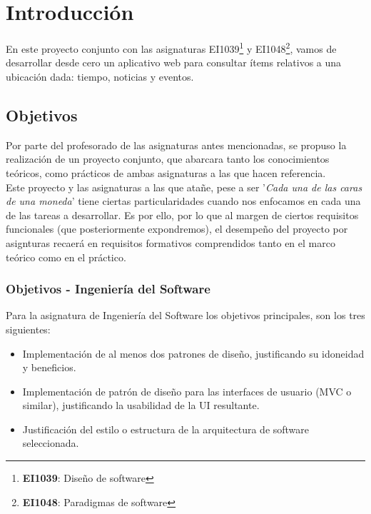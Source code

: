 \documentclass[../ei103948-project-documentation.tex]{subfiles}
\begin{document}
\section{Introducción}

    En este proyecto conjunto con las asignaturas EI1039\footnote{\textbf{EI1039}: Diseño de software} y EI1048\footnote{\textbf{EI1048}: Paradigmas de software}, vamos de desarrollar desde cero un aplicativo web para consultar ítems relativos a una ubicación dada: tiempo, noticias y eventos.\\

    \subsection{Objetivos}
    Por parte del profesorado de las asignaturas antes mencionadas, se propuso la realización de un proyecto conjunto, que abarcara tanto los conocimientos teóricos, como prácticos de ambas asignaturas a las que hacen referencia.\\

    Este proyecto y las asignaturas a las que atañe, pese a ser '\textit{Cada una de las caras de una moneda}' tiene ciertas particularidades cuando nos enfocamos en cada una de las tareas a desarrollar. Es por ello, por lo que al margen de ciertos requisitos funcionales (que posteriormente expondremos), el desempeño del proyecto por asignturas recaerá en requisitos formativos comprendidos tanto en el marco teórico como en el práctico.\\

        \subsubsection{Objetivos - Ingeniería del Software}
        Para la asignatura de Ingeniería del Software los objetivos principales, son los tres siguientes:
            \begin{itemize}
                \item Implementación de al menos dos patrones de diseño, justificando su idoneidad y beneficios.
                \item Implementación de patrón de diseño para las interfaces de usuario (MVC o similar), justificando la usabilidad de la UI resultante.
                \item Justificación del estilo o estructura de la arquitectura de software seleccionada.
            \end{itemize}
        
\end{document}
